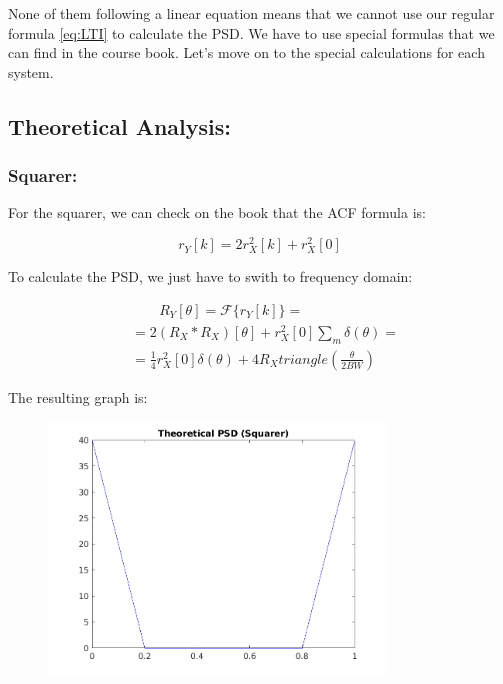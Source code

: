 \documentclass[a4paper,11pt]{article}
\begin{document}
None of them following a linear equation means that we cannot use our regular
formula \eqref{eq:LTI} to calculate the PSD. We have to use special formulas
that we can find in the course book. Let's move on to the special calculations
for each system.

\newpage

\subsection{Theoretical Analysis:}

\subsubsection{Squarer:}

For the squarer, we can check on the book that the ACF formula is:

\begin{equation}\label{eq:r_sq}
  r_Y[k] = 2r_X^2[k] + r_X^2[0]
\end{equation}

To calculate the PSD, we just have to swith to frequency domain:

\begin{equation}\label{eq:R_sq}
  \begin{split}
    & \qquad R_Y[\theta] = \mathcal{F}\{r_Y[k]\} = \\
    & = 2 (R_X \ast R_X)[\theta] +
    r_X^2[0]\displaystyle\sum_{m}\delta(\theta) = \\
    & = \displaystyle\frac{1}{4} r_X^2[0]\delta(\theta) +
    4 R_X triangle(\frac{\theta}{2 BW})
  \end{split}
\end{equation}

The resulting graph is:

\begin{figure}[!hp]
    \begin{center}
      \includegraphics[width=0.8\textwidth]{images/study3/R_th_sq.png}
    \end{center}
\end{figure}
\end{document}
